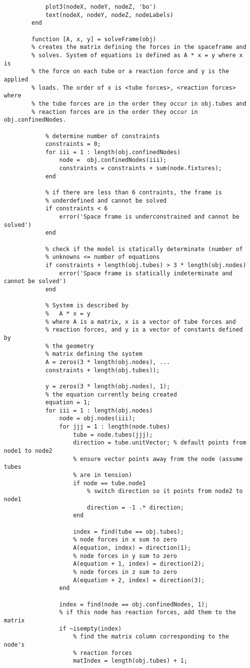 \begin{lstlisting}
			plot3(nodeX, nodeY, nodeZ, 'bo')
			text(nodeX, nodeY, nodeZ, nodeLabels)
		end
		
		function [A, x, y] = solveFrame(obj)
		% creates the matrix defining the forces in the spaceframe and
		% solves. System of equations is defined as A * x = y where x is
		% the force on each tube or a reaction force and y is the applied
		% loads. The order of x is <tube forces>, <reaction forces> where
		% the tube forces are in the order they occur in obj.tubes and 
		% reaction forces are in the order they occur in obj.confinedNodes.
		
			% determine number of constraints
			constraints = 0;
			for iii = 1 : length(obj.confinedNodes)
				node =  obj.confinedNodes(iii);
				constraints = constraints + sum(node.fixtures);
			end
			
			% if there are less than 6 contraints, the frame is
			% underdefined and cannot be solved
			if constraints < 6
				error('Space frame is underconstrained and cannot be solved')
			end
			
			% check if the model is statically determinate (number of
			% unknowns <= number of equations
			if constraints + length(obj.tubes) > 3 * length(obj.nodes)
				error('Space frame is statically indeterminate and cannot be solved')
			end
			
			% System is described by
			%   A * x = y
			% where A is a matrix, x is a vector of tube forces and
			% reaction forces, and y is a vector of constants defined by
			% the geometry
			% matrix defining the system
			A = zeros(3 * length(obj.nodes), ...
			constraints + length(obj.tubes));
			
			y = zeros(3 * length(obj.nodes), 1);
			% the equation currently being created
			equation = 1;
			for iii = 1 : length(obj.nodes)
				node = obj.nodes(iii);
				for jjj = 1 : length(node.tubes)
					tube = node.tubes(jjj);
					direction = tube.unitVector; % default points from node1 to node2
					% ensure vector points away from the node (assume tubes
					% are in tension)
					if node == tube.node1
						% switch direction so it points from node2 to node1
						direction = -1 .* direction;
					end
		
					index = find(tube == obj.tubes);
					% node forces in x sum to zero
					A(equation, index) = direction(1);
					% node forces in y sum to zero
					A(equation + 1, index) = direction(2);
					% node forces in z sum to zero
					A(equation + 2, index) = direction(3);
				end
			
				index = find(node == obj.confinedNodes, 1);
				% if this node has reaction forces, add them to the matrix
				if ~isempty(index)
					% find the matrix column corresponding to the node's
					% reaction forces
					matIndex = length(obj.tubes) + 1;
					

\end{lstlisting}
